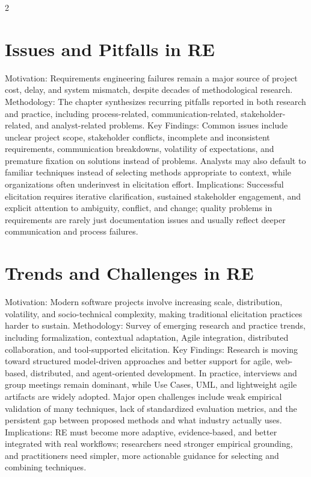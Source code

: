 \documentclass[8pt,a4paper]{extarticle}
\begin{document}
\begin{multicols*}{2}
    \section{Issues and Pitfalls in RE}
    Motivation: Requirements engineering failures remain a major source of project cost, delay, and system mismatch, despite decades of methodological research. Methodology: The chapter synthesizes recurring pitfalls reported in both research and practice, including process-related, communication-related, stakeholder-related, and analyst-related problems. Key Findings: Common issues include unclear project scope, stakeholder conflicts, incomplete and inconsistent requirements, communication breakdowns, volatility of expectations, and premature fixation on solutions instead of problems. Analysts may also default to familiar techniques instead of selecting methods appropriate to context, while organizations often underinvest in elicitation effort. Implications: Successful elicitation requires iterative clarification, sustained stakeholder engagement, and explicit attention to ambiguity, conflict, and change; quality problems in requirements are rarely just documentation issues and usually reflect deeper communication and process failures.

    \section{Trends and Challenges in RE}
    Motivation: Modern software projects involve increasing scale, distribution, volatility, and socio-technical complexity, making traditional elicitation practices harder to sustain. Methodology: Survey of emerging research and practice trends, including formalization, contextual adaptation, Agile integration, distributed collaboration, and tool-supported elicitation. Key Findings: Research is moving toward structured model-driven approaches and better support for agile, web-based, distributed, and agent-oriented development. In practice, interviews and group meetings remain dominant, while Use Cases, UML, and lightweight agile artifacts are widely adopted. Major open challenges include weak empirical validation of many techniques, lack of standardized evaluation metrics, and the persistent gap between proposed methods and what industry actually uses. Implications: RE must become more adaptive, evidence-based, and better integrated with real workflows; researchers need stronger empirical grounding, and practitioners need simpler, more actionable guidance for selecting and combining techniques.


\end{multicols*}
\end{document}
